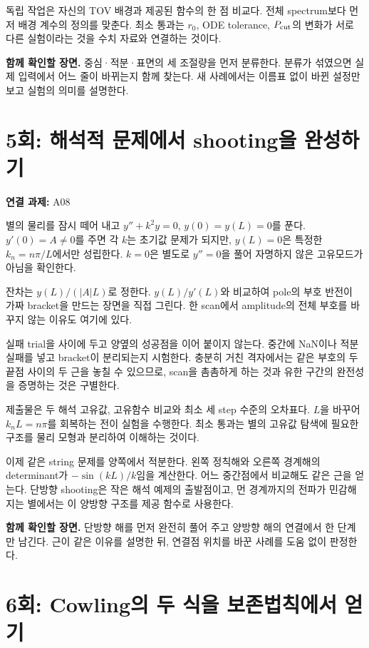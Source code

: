 \documentclass[
  10pt,
  a4paper,
]{article}
\begin{document}
독립 작업은 자신의 TOV 배경과 제공된 함수의 한 점 비교다. 전체
spectrum보다 먼저 배경 계수의 정의를 맞춘다. 최소 통과는 \(r_0\), ODE
tolerance, \(P_{\rm cut}\)의 변화가 서로 다른 실험이라는 것을 수치
자료와 연결하는 것이다.

\textbf{함께 확인할 장면.} 중심·적분·표면의 세 조절량을 먼저 분류한다.
분류가 섞였으면 실제 입력에서 어느 줄이 바뀌는지 함께 찾는다. 새
사례에서는 이름표 없이 바뀐 설정만 보고 실험의 의미를 설명한다.

\section{5회: 해석적 문제에서 shooting을
완성하기}\label{uxd68c-uxd574uxc11duxc801-uxbb38uxc81cuxc5d0uxc11c-shootinguxc744-uxc644uxc131uxd558uxae30}

\textbf{연결 과제:} A08

별의 물리를 잠시 떼어 내고 \(y''+k^2y=0\), \(y(0)=y(L)=0\)를 푼다.
\(y'(0)=A\ne0\)를 주면 각 \(k\)는 초기값 문제가 되지만, \(y(L)=0\)은
특정한 \(k_n=n\pi/L\)에서만 성립한다. \(k=0\)은 별도로 \(y''=0\)을 풀어
자명하지 않은 고유모드가 아님을 확인한다.

잔차는 \(y(L)/(|A|L)\)로 정한다. \(y(L)/y'(L)\)와 비교하여 pole의 부호
반전이 가짜 bracket을 만드는 장면을 직접 그린다. 한 scan에서 amplitude의
전체 부호를 바꾸지 않는 이유도 여기에 있다.

실패 trial을 사이에 두고 양옆의 성공점을 이어 붙이지 않는다. 중간에
NaN이나 적분 실패를 넣고 bracket이 분리되는지 시험한다. 충분히 거친
격자에서는 같은 부호의 두 끝점 사이의 두 근을 놓칠 수 있으므로, scan을
촘촘하게 하는 것과 유한 구간의 완전성을 증명하는 것은 구별한다.

제출물은 두 해석 고유값, 고유함수 비교와 최소 세 step 수준의 오차표다.
\(L\)을 바꾸어 \(k_nL=n\pi\)를 회복하는 전이 실험을 수행한다. 최소
통과는 별의 고유값 탐색에 필요한 구조를 물리 모형과 분리하여 이해하는
것이다.

이제 같은 string 문제를 양쪽에서 적분한다. 왼쪽 정칙해와 오른쪽 경계해의
determinant가 \(-\sin(kL)/k\)임을 계산한다. 어느 중간점에서 비교해도
같은 근을 얻는다. 단방향 shooting은 작은 해석 예제의 출발점이고, 먼
경계까지의 전파가 민감해지는 별에서는 이 양방향 구조를 제공 함수로
사용한다.

\textbf{함께 확인할 장면.} 단방향 해를 먼저 완전히 풀어 주고 양방향 해의
연결에서 한 단계만 남긴다. 근이 같은 이유를 설명한 뒤, 연결점 위치를
바꾼 사례를 도움 없이 판정한다.

\section{6회: Cowling의 두 식을 보존법칙에서
얻기}\label{uxd68c-cowlinguxc758-uxb450-uxc2dduxc744-uxbcf4uxc874uxbc95uxce59uxc5d0uxc11c-uxc5bbuxae30}
\end{document}
